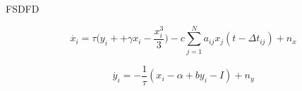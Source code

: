 \documentclass[12pt]{article}
\begin{document}
FSDFD


\begin{equation}
\dot{x_i} = \tau \Bigg( y_i +  + \gamma x_i - \frac{x_i^3}{3}  \Bigg) - c \sum_{j=1}^N a_{ij} x_j(t-\Delta t_{ij}) + n_{x}
\end{equation}

\begin{equation}
\dot{y_i} = -\frac{1}{\tau}(x_i - \alpha + by_i - I) + n_{y}
\end{equation}
\end{document}
